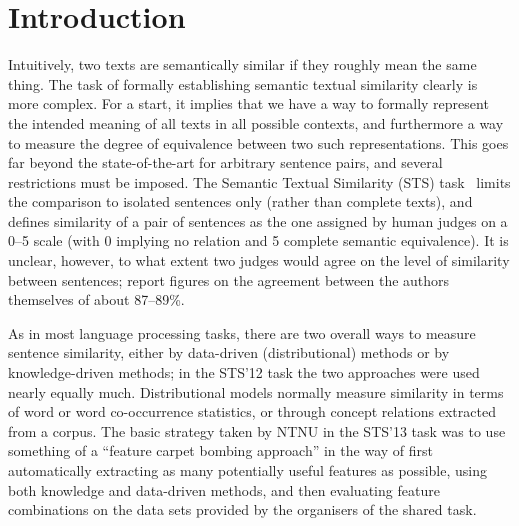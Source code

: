 \section{Introduction}

Intuitively, two texts are semantically similar if they roughly mean the same thing.
The task of formally establishing semantic textual similarity clearly is more complex. For a start,
it implies that we have a way to formally represent the intended meaning of all texts in all possible
contexts, and furthermore a way to measure the degree of equivalence between two such representations.
This goes far beyond the state-of-the-art for arbitrary sentence pairs, and several restrictions must be imposed.
The Semantic Textual Similarity (STS) task~\citep{AgirreEA:12,AgirreEA:13} limits the
comparison to isolated sentences only (rather than complete texts), and defines similarity
of a pair of sentences as the one assigned by human judges %
on a 0--5 scale (with 0 implying no relation and 5 complete semantic equivalence).
%
It is unclear, however, to what extent two judges would agree
on the level of similarity between sentences;
\citet{AgirreEA:12} report figures on the agreement between the authors 
themselves of about 87--89\%.

As in most language processing tasks, there are two overall ways to measure sentence similarity,
either by data-driven (distributional) methods or by knowledge-driven methods; 
in the STS'12 task the two approaches were used nearly equally much.
Distributional models normally measure similarity in terms of word or word co-occurrence statistics, 
or through concept relations extracted from a corpus.
The basic strategy taken by NTNU in the STS'13 task was to use something of a 
``feature carpet bombing approach'' in the way of first automatically extracting as many 
potentially useful features as possible, using both knowledge and data-driven methods,
and then evaluating feature combinations on the data sets provided by the organisers of the shared task.

